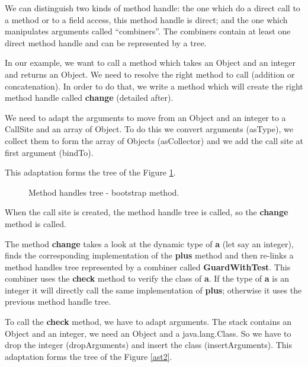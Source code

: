 \documentclass{sig-alternate}
\begin{document}
      We can distinguish two kinds of method handle:
      the one which do a direct call to a method or to a field access, this method handle is direct;
      and the one which manipulates arguments called ``combiners''.
      The combiners contain at least one direct method handle and can be represented by a tree.

      In our example, we want to call a method which takes an Object and an integer and returns an Object.
      We need to resolve the right method to call (addition or concatenation).
      In order to do that, we write a method which will create the right method handle called {\bf change} (detailed after).

      We need to adapt the arguments to move from an Object and an integer to a CallSite and an array of Object.
      To do this we convert arguments (asType), we collect them to form the array of Objects (asCollector) and we add the call site at first argument (bindTo).

      

      \noindent This adaptation forms the tree of the Figure \ref{ast1}.

      \begin{figure}[!h]
        \centering \resizebox{.6\linewidth}{!}{}
        \caption{Method handles tree - bootstrap method.}
        \label{ast1}
      \end{figure}

      When the call site is created, the method handle tree is called, so the {\bf change} method is called.

      

      The method {\bf change} takes a look at the dynamic type of {\bf a} (let say an integer),
      finds the corresponding implementation of the {\bf plus} method
      and then re-links a method handles tree represented by a combiner called {\bf GuardWithTest}.
      This combiner uses the {\bf check} method to verify the class of {\bf a}.
      If the type of {\bf a} is an integer it will directly call the same implementation of {\bf plus};
      otherwise it uses the previous method handle tree.

      To call the {\bf check} method, we have to adapt arguments.
      The stack contains an Object and an integer, we need an Object and a java.lang.Class.
      So we have to drop the integer (dropArguments) and insert the class (insertArguments).
      This adaptation forms the tree of the Figure \ref{ast2}.
\end{document}
